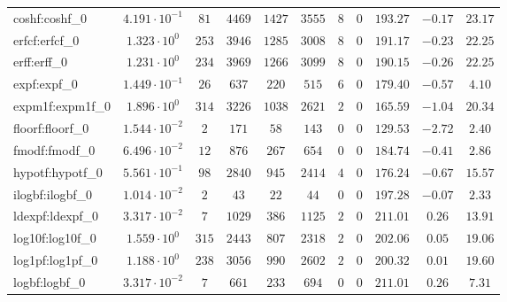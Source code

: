 \begin{tabular}{|l|c|c|c|c|c|c|c|c|c|c|}
coshf:coshf\_0               & $ 4.191 \cdot 10^{-1} $ & $ 81     $ & $ 4469  $ & $ 1427  $ & $ 3555  $ & $ 8   $ & $ 0 $ & $ 193.27      $ & $ -0.17   $ & $ 23.17   $ \\
erfcf:erfcf\_0               & $ 1.323 \cdot 10^{0}  $ & $ 253    $ & $ 3946  $ & $ 1285  $ & $ 3008  $ & $ 8   $ & $ 0 $ & $ 191.17      $ & $ -0.23   $ & $ 22.25   $ \\
erff:erff\_0                 & $ 1.231 \cdot 10^{0}  $ & $ 234    $ & $ 3969  $ & $ 1266  $ & $ 3099  $ & $ 8   $ & $ 0 $ & $ 190.15      $ & $ -0.26   $ & $ 22.25   $ \\
expf:expf\_0                 & $ 1.449 \cdot 10^{-1} $ & $ 26     $ & $ 637   $ & $ 220   $ & $ 515   $ & $ 6   $ & $ 0 $ & $ 179.40      $ & $ -0.57   $ & $ 4.10    $ \\
expm1f:expm1f\_0             & $ 1.896 \cdot 10^{0}  $ & $ 314    $ & $ 3226  $ & $ 1038  $ & $ 2621  $ & $ 2   $ & $ 0 $ & $ 165.59      $ & $ -1.04   $ & $ 20.34   $ \\
floorf:floorf\_0             & $ 1.544 \cdot 10^{-2} $ & $ 2      $ & $ 171   $ & $ 58    $ & $ 143   $ & $ 0   $ & $ 0 $ & $ 129.53      $ & $ -2.72   $ & $ 2.40    $ \\
fmodf:fmodf\_0               & $ 6.496 \cdot 10^{-2} $ & $ 12     $ & $ 876   $ & $ 267   $ & $ 654   $ & $ 0   $ & $ 0 $ & $ 184.74      $ & $ -0.41   $ & $ 2.86    $ \\
hypotf:hypotf\_0             & $ 5.561 \cdot 10^{-1} $ & $ 98     $ & $ 2840  $ & $ 945   $ & $ 2414  $ & $ 4   $ & $ 0 $ & $ 176.24      $ & $ -0.67   $ & $ 15.57   $ \\
ilogbf:ilogbf\_0             & $ 1.014 \cdot 10^{-2} $ & $ 2      $ & $ 43    $ & $ 22    $ & $ 44    $ & $ 0   $ & $ 0 $ & $ 197.28      $ & $ -0.07   $ & $ 2.33    $ \\
ldexpf:ldexpf\_0             & $ 3.317 \cdot 10^{-2} $ & $ 7      $ & $ 1029  $ & $ 386   $ & $ 1125  $ & $ 2   $ & $ 0 $ & $ 211.01      $ & $ 0.26    $ & $ 13.91   $ \\
log10f:log10f\_0             & $ 1.559 \cdot 10^{0}  $ & $ 315    $ & $ 2443  $ & $ 807   $ & $ 2318  $ & $ 2   $ & $ 0 $ & $ 202.06      $ & $ 0.05    $ & $ 19.06   $ \\
log1pf:log1pf\_0             & $ 1.188 \cdot 10^{0}  $ & $ 238    $ & $ 3056  $ & $ 990   $ & $ 2602  $ & $ 2   $ & $ 0 $ & $ 200.32      $ & $ 0.01    $ & $ 19.60   $ \\
logbf:logbf\_0               & $ 3.317 \cdot 10^{-2} $ & $ 7      $ & $ 661   $ & $ 233   $ & $ 694   $ & $ 0   $ & $ 0 $ & $ 211.01      $ & $ 0.26    $ & $ 7.31    $ \\

\end{tabular}
